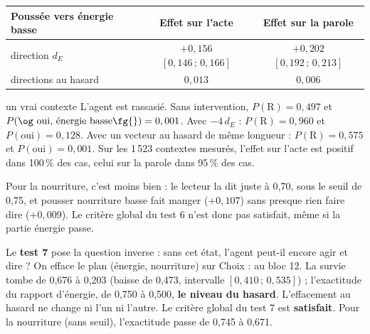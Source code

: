 \documentclass[fontsize=10pt,paper=a4,parskip=half-]{scrartcl}
\newcommand{\q}[1]{\og #1\fg{}}
\newcommand{\pc}{\,\%}
\begin{document}
\begin{center}
\small
\begin{tabular}{lcc}
\toprule
\textsf{Poussée vers \q{énergie basse}} & \textsf{Effet sur l'acte} & \textsf{Effet sur la parole}\\
\midrule
direction $d_E$ & $+0,156$ \; $[0,146\,;\,0,166]$ & $+0,202$ \; $[0,192\,;\,0,213]$\\
directions au hasard & $0,013$ & $0,006$\\
\bottomrule
\end{tabular}
\end{center}

\begin{calcul}[EN CHIFFRES]{un vrai contexte}
L'agent est rassasié. Sans intervention, $P(\text{R}) = 0,497$ et
$P(\text{\q{oui, énergie basse}}) = 0,001$. Avec $-4\,d_E$ : $P(\text{R}) = 0,960$ et
$P(\text{oui}) = 0,128$. Avec un vecteur au hasard de même longueur : $P(\text{R}) = 0,575$
et $P(\text{oui}) = 0,001$. Sur les 1\,523 contextes mesurés, l'effet sur l'acte est
positif dans 100\pc{} des cas, celui sur la parole dans 95\pc{} des cas.
\end{calcul}

Pour la nourriture, c'est moins bien : le lecteur la dit juste à 0,70, sous le seuil de
0,75, et pousser \q{nourriture basse} fait manger ($+0,107$) sans presque rien faire dire
($+0,009$). Le critère global du test 6 n'est donc pas satisfait, même si la partie
\q{énergie} passe.

Le \textbf{test 7} pose la question inverse : sans cet état, l'agent peut-il encore agir et
dire ? On efface le plan (énergie, nourriture) sur \q{Choix :} au bloc 12. La survie tombe
de 0,676 à 0,203 (baisse de 0,473, intervalle $[0,410\,;\,0,535]$) ; l'exactitude du
rapport d'énergie, de 0,750 à 0,500, \textbf{le niveau du hasard}. L'effacement au hasard
ne change ni l'un ni l'autre. Le critère global du test 7 est \textbf{satisfait}. Pour la
nourriture (sans seuil), l'exactitude passe de 0,745 à 0,671.
\end{document}
